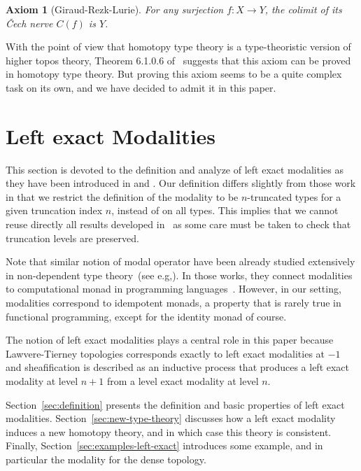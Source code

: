 \documentclass[conference]{IEEEtran}
\newtheorem{ax}[thm]{Axiom}
\newcommand{\eg}{e.g,\xspace}
\begin{document}
\begin{ax}[Giraud-Rezk-Lurie]
  For any surjection $f : X \to Y$, the colimit of its \v{C}ech nerve
  $C(f)$ is $Y$.
\end{ax}

With the point of view that homotopy type theory is a type-theoristic
version of higher topos theory, Theorem 6.1.0.6 of~\cite{lurie}
suggests that this axiom can be proved in homotopy type theory. 
%
But proving this axiom seems to be a quite complex task on its own,
and we have decided to admit it in this paper.



\section{Left exact Modalities}
\label{sec:lexmod}

This section is devoted to the definition and analyze of left exact
modalities as they have been introduced in \cite{hottbook} and
\cite{shulman-higher-modalities}. Our definition differs slightly from
those work in that we restrict the definition of the modality to be
$n$-truncated types for a given truncation index $n$, instead of on
all types.
%
This implies that we cannot reuse directly all results developed
in~\cite{hottbook} as some care must be taken to check that truncation
levels are preserved.

Note that similar notion of modal operator have been already studied
extensively in non-dependent type
theory~(see \eg \cite{benton1998computational}). In those works, they connect
modalities to computational monad in programming
languages~\cite{moggi-monad}. However, in our setting, modalities
correspond to idempotent monads, a property that is rarely true 
in functional programming, except for the identity monad of course.

The notion of left exact modalities plays a central role in this paper
because Lawvere-Tierney topologies corresponds exactly to left exact
modalities at $-1$ and sheafification is described as an inductive
process that produces a left exact modality at level $n+1$ from a
level exact modality at level $n$. 

Section~\ref{sec:definition} presents the definition and basic
properties of left exact modalities. 
%
Section~\ref{sec:new-type-theory} discusses how a left exact modality
induces a new homotopy theory, and in which case this theory is
consistent.
%
Finally, Section~\ref{sec:examples-left-exact} introduces some
example, and in particular the modality for the dense topology.
\end{document}
